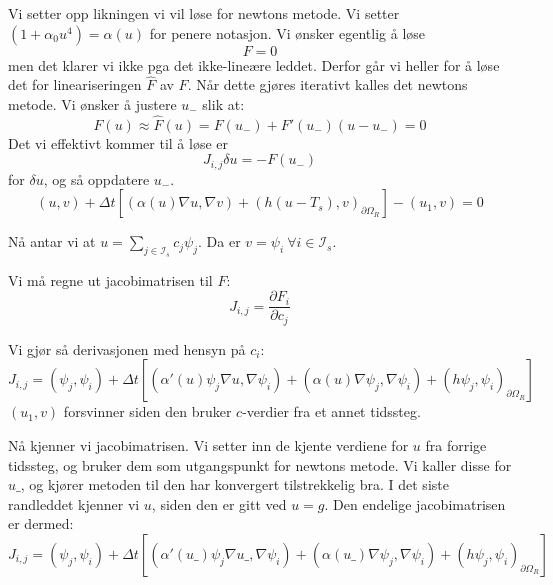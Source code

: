 \documentclass[a4paper, 10pt]{article}
\newcommand{\mc}{\mathcal}
\begin{document}
Vi setter opp likningen vi vil løse for newtons metode. Vi setter $(1+\alpha_0 u^4) = \alpha(u)$ for penere notasjon. 
Vi ønsker egentlig å løse
\begin{equation}
	F = 0
\end{equation}
men det klarer vi ikke pga det ikke-lineære leddet. Derfor går vi heller for å løse det for lineariseringen $\hat{F}$ av $F$. Når dette gjøres iterativt kalles det newtons metode. Vi ønsker å justere $u_-$ slik at:
\begin{equation}
	F(u) \approx \hat{F}(u) = F(u_-) + F'(u_-)(u-u_-) = 0
\end{equation}
Det vi effektivt kommer til å løse er
\begin{equation}
	J_{i,j} \delta u = -F(u_-)
\end{equation}
for $\delta u$, og så oppdatere $u_-$. 
\begin{equation}
	(u, v) + \Delta t \left[(\alpha(u)\nabla u, \nabla v) + 
	\left( h(u-T_s), v \right)_{\partial \Omega_R} \right] -(u_1, v) = 0
\end{equation}

Nå antar vi at $u = \sum_{j \in \mc{I}_s} c_j\psi_j$. Da er $v = \psi_i \ \forall i \in \mc{I}_s$.

Vi må regne ut jacobimatrisen til $F$:
\begin{equation}
	J_{i, j} = \frac{\partial F_i}{\partial c_j}
\end{equation}

Vi gjør så derivasjonen med hensyn på $c_i$:
\begin{equation}
	J_{i, j} = (\psi_j, \psi_i) + \Delta t\left[ (\alpha'(u) \psi_j \nabla u, \nabla \psi_i)
	+ (\alpha(u) \nabla \psi_j, \nabla\psi_i)
	+ (h\psi_j, \psi_i)_{\partial \Omega_R} \right]
\end{equation}
$(u_1, v)$ forsvinner siden den bruker $c$-verdier fra et annet tidssteg.

Nå kjenner vi jacobimatrisen. Vi setter inn de kjente verdiene for $u$ fra forrige tidssteg, og bruker dem som utgangspunkt for newtons metode. Vi kaller disse for $u\_$, og kjører metoden til den har konvergert tilstrekkelig bra. I det siste randleddet kjenner vi $u$, siden den er gitt ved $u = g$. Den endelige jacobimatrisen er dermed:
\begin{equation}
		J_{i, j} = (\psi_j, \psi_i) + \Delta t\left[ (\alpha'(u\_) \psi_j \nabla u\_, \nabla \psi_i)
	+ (\alpha(u\_) \nabla \psi_j, \nabla\psi_i)
	+ (h\psi_j, \psi_i)_{\partial \Omega_R}\right]
\end{equation}
\end{document}
